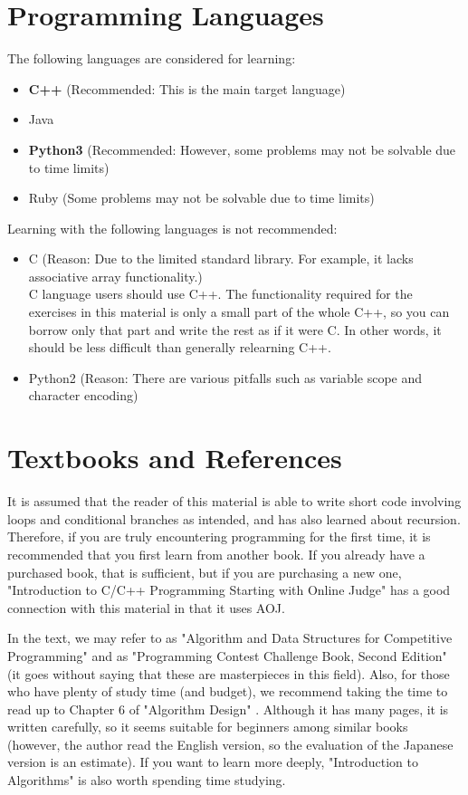 \section{Programming Languages}

The following languages are considered for learning:
\begin{itemize}
\item \textbf{C++} (Recommended: This is the main target language)
\item Java
\item \textbf{Python3} (Recommended: However, some problems may not be solvable due to time limits)
\item Ruby (Some problems may not be solvable due to time limits)
\end{itemize}

Learning with the following languages is not recommended:
\begin{itemize}
\item C (Reason: Due to the limited standard library. For example, it lacks associative array functionality.)\\
  C language users should use C++. The functionality required for the exercises in this material is only a small part of the whole C++, so you can borrow only that part and write the rest as if it were C. In other words, it should be less difficult than generally relearning C++.
\item Python2 (Reason: There are various pitfalls such as variable scope and character encoding)
\end{itemize}
\section{Textbooks and References}

It is assumed that the reader of this material is able to write short code involving loops and conditional branches as intended, and has also learned about recursion.
Therefore, if you are truly encountering programming for the first time, it is recommended that you first learn from another book. If you already have a purchased book, that is sufficient, but if you are purchasing a new one, "Introduction to C/C++ Programming Starting with Online Judge" \cite{book:aojcpp} has a good connection with this material in that it uses AOJ.

In the text, we may refer to
\pccbook{} as "Algorithm and Data Structures for Competitive Programming" and
\pcaojbook{} as "Programming Contest Challenge Book, Second Edition" (it goes without saying that these are masterpieces in this field).
Also, for those who have plenty of study time (and budget), we recommend taking the time to read up to Chapter 6 of "Algorithm Design" \cite{book:algorithmdesign}. Although it has many pages, it is written carefully, so it seems suitable for beginners among similar books (however, the author read the English version, so the evaluation of the Japanese version is an estimate). If you want to learn more deeply, "Introduction to Algorithms" \cite{book:algorithmintroduction} is also worth spending time studying.
